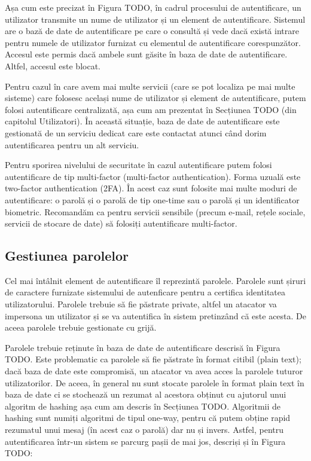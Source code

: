 Așa cum este precizat în Figura TODO, în cadrul procesului de autentificare, un utilizator transmite un nume de utilizator și un element de autentificare. Sistemul are o bază de date de autentificare pe care o consultă și vede dacă există intrare pentru numele de utilizator furnizat cu elementul de autentificare corespunzător. Accesul este permis dacă ambele sunt găsite în baza de date de autentificare. Altfel, accesul este blocat.

Pentru cazul în care avem mai multe servicii (care se pot localiza pe mai multe sisteme) care folosesc același nume de utilizator și element de autentificare, putem folosi autentificare centralizată, așa cum am prezentat în Secțiunea TODO (din capitolul Utilizatori). În această situație, baza de date de autentificare este gestionată de un serviciu dedicat care este contactat atunci când dorim autentificarea pentru un alt serviciu.

Pentru sporirea nivelului de securitate în cazul autentificare putem folosi autentificare de tip multi-factor (multi-factor authentication). Forma uzuală este two-factor authentication (2FA). În acest caz sunt folosite mai multe moduri de autentificare: o parolă și o parolă de tip one-time sau o parolă și un identificator biometric. Recomandăm ca pentru servicii sensibile (precum e-mail, rețele sociale, servicii de stocare de date) să folosiți autentificare multi-factor.

\subsection{Gestiunea parolelor}
\label{sec:sec:password}

Cel mai întâlnit element de autentificare îl reprezintă parolele. Parolele sunt șiruri de caractere furnizate sistemului de autenficare pentru a certifica identitatea utilizatorului. Parolele trebuie să fie păstrate private, altfel un atacator va impersona un utilizator și se va autentifica în sistem pretinzând că este acesta. De aceea parolele trebuie gestionate cu grijă.

Parolele trebuie reținute în baza de date de autentificare descrisă în Figura TODO. Este problematic ca parolele să fie păstrate în format citibil (plain text); dacă baza de date este compromisă, un atacator va avea acces la parolele tuturor utilizatorilor. De aceea, în general nu sunt stocate parolele în format plain text în baza de date ci se stochează un rezumat al acestora obținut cu ajutorul unui algoritm de hashing așa cum am descris în Secțiunea TODO. Algoritmii de hashing sunt numiți algoritmi de tipul one-way, pentru că putem obține rapid rezumatul unui mesaj (în acest caz o parolă) dar nu și invers. Astfel, pentru autentificarea într-un sistem se parcurg pașii de mai jos, descriși și în Figura TODO:

